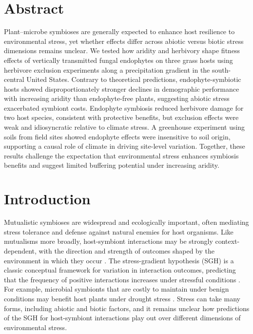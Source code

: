 \documentclass[12pt]{article}\usepackage[]{graphicx}\usepackage[dvipsnames]{xcolor}
\begin{document}
\section*{Abstract}
Plant–microbe symbioses are generally expected to enhance host resilience to environmental stress, yet whether effects differ across abiotic versus biotic stress dimensions remains unclear. 
We tested how aridity and herbivory shape fitness effects of vertically transmitted fungal endophytes on three grass hosts using herbivore exclusion experiments along a precipitation gradient in the south-central United States.
Contrary to theoretical predictions, endophyte-symbiotic hosts showed disproportionately stronger declines in demographic performance with increasing aridity than endophyte-free plants, suggesting abiotic stress exacerbated symbiont costs. 
Endophyte symbiosis reduced herbivore damage for two host species, consistent with protective benefits, but exclusion effects were weak and idiosyncratic relative to climate stress. 
A greenhouse experiment using soils from field sites showed endophyte effects were insensitive to soil origin, supporting a causal role of climate in driving site-level variation. Together, these results challenge the expectation that environmental stress enhances symbiosis benefits and suggest limited buffering potential under increasing aridity.
\newpage
\section*{Introduction}
Mutualistic symbioses are widespread and ecologically important, often mediating stress tolerance and defense against natural enemies for host organisms. 
Like mutualisms more broadly, host-symbiont interactions may be strongly context-dependent, with the direction and strength of outcomes shaped by the environment in which they occur \citep{hoeksema2015context, bronstein1994conditional,hoang2024impacts,rudgers2020climate}. 
The stress-gradient hypothesis (SGH) is a classic conceptual framework for variation in interaction outcomes, predicting that the frequency of positive interactions increases under stressful conditions \citep{louthan2015and,bertness1994positive,holmgren2010strong,maestre2009refining}.
For example, microbial symbionts that are costly to maintain under benign conditions may benefit host plants under drought stress  \citep{giauque2019endophyte}. 
Stress can take many forms, including abiotic and biotic factors, and it remains unclear how predictions of the SGH for host-symbiont interactions play out over different dimensions of environmental stress. 
\end{document}
